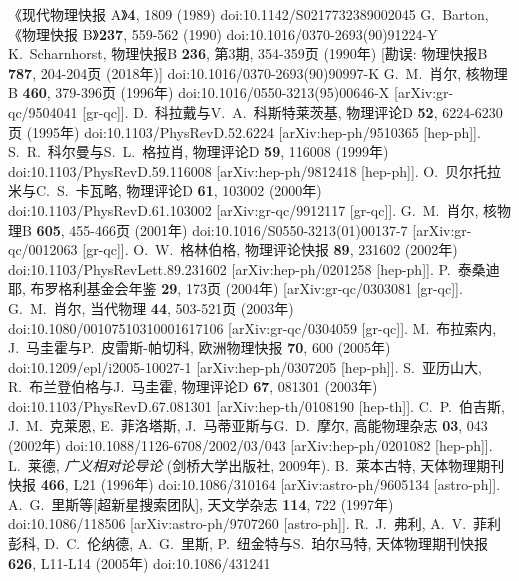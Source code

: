 \documentclass[jkps,preprint,fleqn]{revtex4}
\begin{document}
\begin{thebibliography}{999}
《现代物理快报 A》\textbf{4}, 1809 (1989)
doi:10.1142/S0217732389002045
G.~Barton,
《物理快报 B》\textbf{237}, 559-562 (1990)
doi:10.1016/0370-2693(90)91224-Y
K.~Scharnhorst,
物理快报B \textbf{236}, 第3期, 354-359页 (1990年)
[勘误: 物理快报B \textbf{787}, 204-204页 (2018年)]
doi:10.1016/0370-2693(90)90997-K
G.~M.~肖尔,
核物理B \textbf{460}, 379-396页 (1996年)
doi:10.1016/0550-3213(95)00646-X
[arXiv:gr-qc/9504041 [gr-qc]].
D.~科拉戴与V.~A.~科斯特莱茨基,
物理评论D \textbf{52}, 6224-6230页 (1995年)
doi:10.1103/PhysRevD.52.6224
[arXiv:hep-ph/9510365 [hep-ph]].
S.~R.~科尔曼与S.~L.~格拉肖,
物理评论D \textbf{59}, 116008 (1999年)
doi:10.1103/PhysRevD.59.116008
[arXiv:hep-ph/9812418 [hep-ph]].
O.~贝尔托拉米与C.~S.~卡瓦略,
物理评论D \textbf{61}, 103002 (2000年)
doi:10.1103/PhysRevD.61.103002
[arXiv:gr-qc/9912117 [gr-qc]].
G.~M.~肖尔,
核物理B \textbf{605}, 455-466页 (2001年)
doi:10.1016/S0550-3213(01)00137-7
[arXiv:gr-qc/0012063 [gr-qc]].
O.~W.~格林伯格,
物理评论快报 \textbf{89}, 231602 (2002年)
doi:10.1103/PhysRevLett.89.231602
[arXiv:hep-ph/0201258 [hep-ph]].
P.~泰桑迪耶,
布罗格利基金会年鉴 \textbf{29}, 173页 (2004年)
[arXiv:gr-qc/0303081 [gr-qc]].
G.~M.~肖尔,
当代物理 \textbf{44}, 503-521页 (2003年)
doi:10.1080/00107510310001617106
[arXiv:gr-qc/0304059 [gr-qc]].
M.~布拉索内, J.~马圭霍与P.~皮雷斯-帕切科,
欧洲物理快报 \textbf{70}, 600 (2005年)
doi:10.1209/epl/i2005-10027-1
[arXiv:hep-ph/0307205 [hep-ph]].
S.~亚历山大, R.~布兰登伯格与J.~马圭霍,
物理评论D \textbf{67}, 081301 (2003年)
doi:10.1103/PhysRevD.67.081301
[arXiv:hep-th/0108190 [hep-th]].
C.~P.~伯吉斯, J.~M.~克莱恩, E.~菲洛塔斯, J.~马蒂亚斯与G.~D.~摩尔,
高能物理杂志 \textbf{03}, 043 (2002年)
doi:10.1088/1126-6708/2002/03/043
[arXiv:hep-ph/0201082 [hep-ph]].
 L.~莱德, \textit{广义相对论导论} (剑桥大学出版社, 2009年).
B.~莱本古特,
天体物理期刊快报 \textbf{466}, L21 (1996年)
doi:10.1086/310164
[arXiv:astro-ph/9605134 [astro-ph]].
A.~G.~里斯等[超新星搜索团队],
天文学杂志 \textbf{114}, 722 (1997年)
doi:10.1086/118506
[arXiv:astro-ph/9707260 [astro-ph]].
R.~J.~弗利, A.~V.~菲利彭科, D.~C.~伦纳德, A.~G.~里斯, P.~纽金特与S.~珀尔马特,
天体物理期刊快报 \textbf{626}, L11-L14 (2005年)
doi:10.1086/431241

\end{thebibliography}
\end{document}
